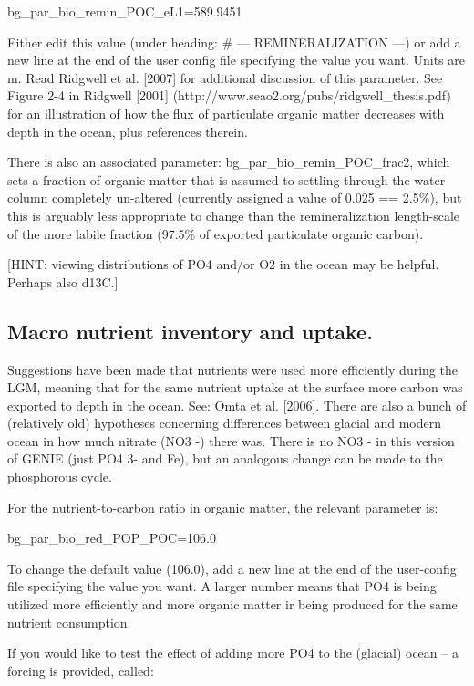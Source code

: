 \documentclass[11pt,fleqn]{book} %
\begin{document}
bg\_par\_bio\_remin\_POC\_eL1=589.9451

Either edit this value (under heading: \# --- REMINERALIZATION ---) or add a new line at
the end of the user config file specifying the value you want. Units are m.
Read Ridgwell et al. [2007] for additional discussion of this parameter. See Figure 2-4 in
Ridgwell [2001] (http://www.seao2.org/pubs/ridgwell\_thesis.pdf) for an illustration of how
the flux of particulate organic matter decreases with depth in the ocean, plus references
therein.

There is also an associated parameter: bg\_par\_bio\_remin\_POC\_frac2, which sets a
fraction of organic matter that is assumed to settling through the water column completely
un-altered (currently assigned a value of 0.025 == 2.5\%), but this is arguably less
appropriate to change than the remineralization length-scale of the more labile fraction
(97.5\% of exported particulate organic carbon).

[HINT: viewing distributions of PO4 and/or O2 in the ocean may be helpful. Perhaps also
d13C.]

%
\subsection{Macro nutrient inventory and uptake.}

Suggestions have been made that nutrients were
used more efficiently during the LGM, meaning that for the same nutrient uptake at the
surface more carbon was exported to depth in the ocean. See: Omta et al. [2006]. There
are also a bunch of (relatively old) hypotheses concerning differences between glacial and
modern ocean in how much nitrate (NO3
-) there was. There is no NO3
- in this version of
GENIE (just PO4
3- and Fe), but an analogous change can be made to the phosphorous
cycle.

For the nutrient-to-carbon ratio in organic matter, the relevant parameter is:

bg\_par\_bio\_red\_POP\_POC=106.0

To change the default value (106.0), add a new line at the end of the user-config file
specifying the value you want. A larger number means that PO4 is being utilized more
efficiently and more organic matter ir being produced for the same nutrient consumption.

If you would like to test the effect of adding more PO4 to the (glacial) ocean -- a forcing is
provided, called:
\end{document}
